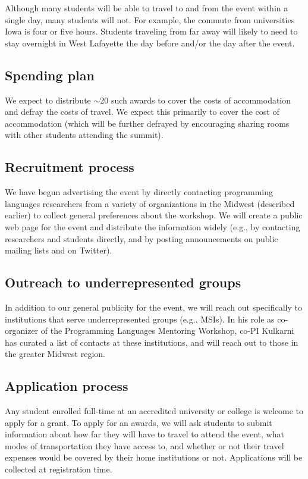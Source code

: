 \documentclass[11pt]{article}
\begin{document}
Although many students will be able to travel to and from the event
within a single day, many 
students will not. For example, the commute from universities 
Iowa is four or five hours. Students traveling from far away will
likely to need to stay overnight in West Lafayette the day before and/or the
day after the event.

\subsection{Spending plan}

We expect to distribute $\sim$20 such awards to cover the costs of accommodation and defray the costs of travel. We expect this primarily to cover the cost of accommodation (which will be further defrayed by encouraging sharing rooms with other students attending the summit).

\subsection{Recruitment process}

We have begun advertising the event by directly contacting programming
languages researchers from a variety of organizations in the Midwest
(described earlier) to collect general preferences about the workshop. We will create a public web page for the event and distribute the information widely
(e.g., by contacting researchers and students directly, and by posting
announcements on public mailing lists and on Twitter).

\subsection{Outreach to underrepresented groups}

In addition to our general publicity for the event, we will reach out specifically to institutions that serve underrepresented groups (e.g., MSIs). In his role as co-organizer of the Programming Languages Mentoring Workshop, co-PI Kulkarni has curated a list of contacts at these institutions, and will reach out to those in the greater Midwest region.

\subsection{Application process}

Any student enrolled full-time at an accredited
university or college is welcome to apply for a grant.
To apply for an awards, we will ask students
to submit information about how far they will have to travel to attend
the event, what modes of transportation they have access to, and
whether or not their travel expenses would be covered by their home
institutions or not. Applications will be collected at registration time. 
\end{document}
